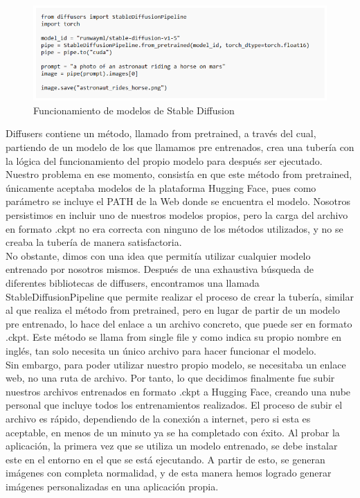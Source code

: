 \begin{figure}[!htb]
	\centering
	\includegraphics[width = 1
	\textwidth]{Imagenes/Vectorial/codigoapp.png}
	\caption{Funcionamiento de modelos de Stable Diffusion}
	\label{fig:codigoapp}
\end{figure}


Diffusers contiene un método, llamado from pretrained, a través del cual, partiendo de un modelo de los que llamamos pre entrenados, crea una tubería con la lógica del funcionamiento del propio modelo para después ser ejecutado. Nuestro problema  en ese momento, consistía en que este método from pretrained, únicamente aceptaba modelos de la plataforma Hugging Face, pues como parámetro se incluye el PATH de la Web donde se encuentra el modelo. Nosotros persistimos en incluir uno de nuestros modelos propios, pero la carga del archivo en formato .ckpt no era correcta con ninguno de los métodos utilizados, y no se creaba la tubería de manera satisfactoria. \\

No obstante, dimos con una idea que permitía utilizar cualquier modelo entrenado por nosotros mismos. Después de una exhaustiva búsqueda de diferentes bibliotecas de diffusers, encontramos una llamada StableDiffusionPipeline que permite realizar el proceso de crear la tubería, similar al que realiza el método from pretrained, pero en lugar de partir de un modelo pre entrenado, lo hace del enlace a un archivo concreto, que puede ser en formato .ckpt. Este método se llama from single file y como indica su propio nombre en inglés, tan solo necesita un único archivo para hacer funcionar el modelo.\\

Sin embargo, para poder utilizar nuestro propio modelo, se necesitaba un enlace web, no una ruta de archivo. Por tanto, lo que decidimos finalmente fue subir nuestros archivos entrenados en formato .ckpt a Hugging Face, creando una nube personal que incluye todos los entrenamientos realizados. El proceso de subir el archivo es rápido, dependiendo de la conexión a internet, pero si esta es aceptable, en menos de un minuto ya se ha completado con éxito. Al probar la aplicación, la primera vez que se utiliza un modelo entrenado, se debe instalar este en el entorno en el que se está ejecutando. A partir de esto, se generan imágenes con completa normalidad, y de esta manera hemos logrado generar imágenes personalizadas en una aplicación propia.\\

